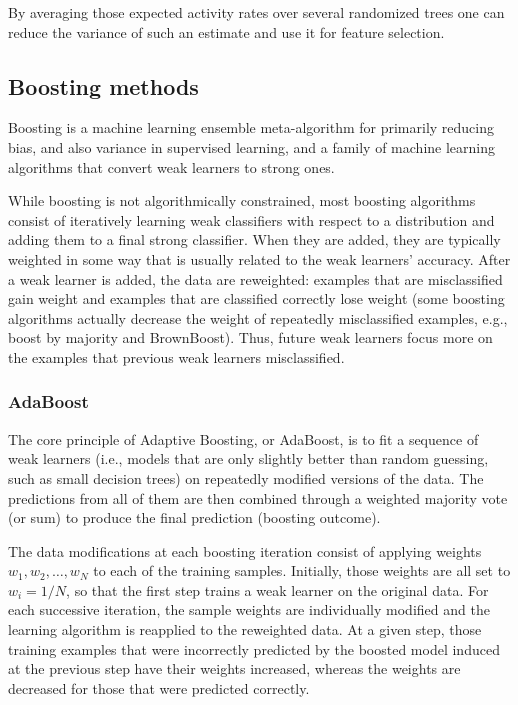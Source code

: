 \documentclass[11pt]{article}
\theoremstyle{plain}
\theoremstyle{definition}
\begin{document}
By averaging those expected activity rates over several randomized trees one can reduce the variance of such an estimate and use it for feature selection.


\subsection{Boosting methods}
Boosting is a machine learning ensemble meta-algorithm for primarily reducing bias, and also variance in supervised learning, and a family of machine learning algorithms that convert weak learners to strong ones.

While boosting is not algorithmically constrained, most boosting algorithms consist of iteratively learning weak classifiers with respect to a distribution and adding them to a final strong classifier. When they are added, they are typically weighted in some way that is usually related to the weak learners' accuracy. After a weak learner is added, the data are reweighted: examples that are misclassified gain weight and examples that are classified correctly lose weight (some boosting algorithms actually decrease the weight of repeatedly misclassified examples, e.g., boost by majority and BrownBoost). Thus, future weak learners focus more on the examples that previous weak learners misclassified.

\subsubsection{AdaBoost}
The core principle of Adaptive Boosting, or AdaBoost, is to fit a sequence of weak learners (i.e., models that are only slightly better than random guessing, such as small decision trees) on repeatedly modified versions of the data. The predictions from all of them are then combined through a weighted majority vote (or sum) to produce the final prediction (boosting outcome). 

The data modifications at each boosting iteration consist of applying weights $w_1, w_2,\dots, w_N$ to each of the training samples. Initially, those weights are all set to $w_i = 1/N$, so that the first step trains a weak learner on the original data. For each successive iteration, the sample weights are individually modified and the learning algorithm is reapplied to the reweighted data. At a given step, those training examples that were incorrectly predicted by the boosted model induced at the previous step have their weights increased, whereas the weights are decreased for those that were predicted correctly. 
\end{document}
